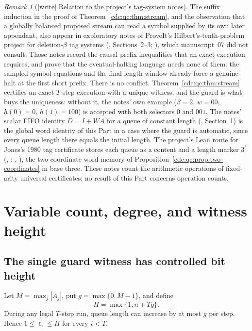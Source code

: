 \documentclass[11pt,a4paper]{article}
\theoremstyle{definition}
\theoremstyle{remark}
\newtheorem{remark}[remark]{Remark}
\newcommand{\srctag}[1]{\texorpdfstring{\hspace{0.5em}{\normalfont\small\color{accent}[#1]}}{ [#1]}}
\begin{document}
\begin{remark}[\textup{[write]} Relation to the project's tag-system notes]\label{cdc:qc:rem:tagnotes}
The suffix induction in the proof of Theorem~\ref{cdc:qc:thm:stream}, and
the observation that a globally balanced proposed stream can read a symbol
supplied by its own later appendant, also appear in exploratory notes of
ProveIt's Hilbert's-tenth-problem project for deletion-$\beta$ tag systems
(,
Sections~2--3; ),
which manuscript~07 did not consult. Those notes record the causal prefix
inequalities that an exact execution requires, and prove that the
eventual-halting language needs none of them: the sampled-symbol equations
and the final length window already force a genuine halt at the first short
prefix. There is no conflict. Theorem~\ref{cdc:qc:thm:stream} certifies an
exact $T$-step execution with a unique witness, and the guard is what buys
the uniqueness: without it, the notes' own example ($\beta=2$, $w=00$,
$h(0)=0$, $h(1)=100$) is accepted with both selectors $0$ and $001$. The
notes' scalar FIFO identity $D=I+WA$ for a queue of constant length
(, Section~1) is the global word
identity of this Part in a case where the guard is automatic, since every
queue length there equals the initial length. The project's Lean route for
Jones's 1980 tag certificate stores each queue as a content and a length
marker $3^{\ell}$ (,
: ,
), the two-coordinate word memory of
Proposition~\ref{cdc:qc:prop:two-coordinates} in base three.
These notes count the arithmetic operations of fixed-arity universal
certificates; no result of this Part concerns operation counts.
\end{remark}


\section{Variable count, degree, and witness height\srctag{07}}\label{cdc:qc:sec:tradeoffs}
\subsection{The single guard witness has controlled bit height}
Let $M=\max_j|A_j|$, put $g=\max\{0,M-1\}$, and define
\begin{equation}\label{cdc:qc:eq:H}
 H=\max\{1,n+Tg\}.
\end{equation}
During any legal $T$-step run, queue length can increase by at most $g$ per step. Hence $1\leq\ell_i\leq H$ for every $i<T$.
\end{document}
